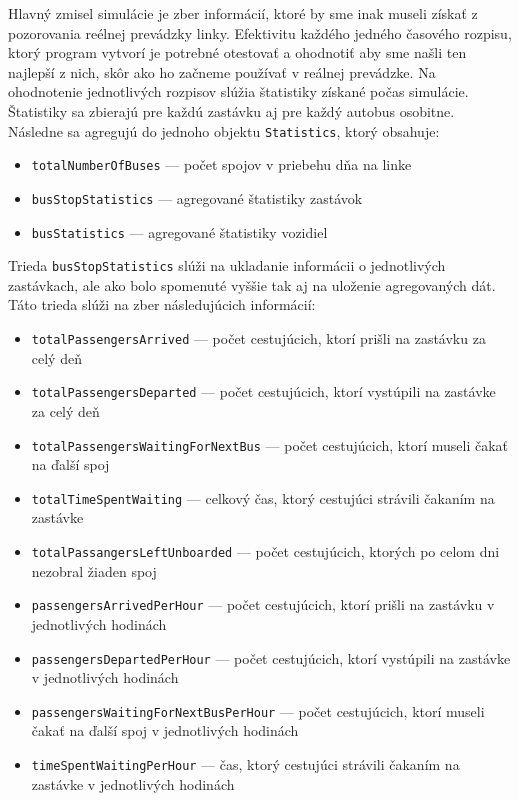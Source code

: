 Hlavný zmisel simulácie je zber informácií, ktoré by sme inak museli získať z pozorovania reélnej prevádzky linky.
Efektivitu každého jedného časového rozpisu, ktorý program vytvorí je potrebné otestovať a ohodnotiť aby sme našli ten najlepší z nich, skôr ako ho začneme používať v reálnej prevádzke.
Na ohodnotenie jednotlivých rozpisov slúžia štatistiky získané počas simulácie.
Štatistiky sa zbierajú pre každú zastávku aj pre každý autobus osobitne.
Následne sa agregujú do jednoho objektu \texttt{Statistics}, ktorý obsahuje:
\begin{itemize}
  \item \texttt{totalNumberOfBuses} --- počet spojov v priebehu dňa na linke
  \item \texttt{busStopStatistics} --- agregované štatistiky zastávok
  \item \texttt{busStatistics} --- agregované štatistiky vozidiel
\end{itemize}

Trieda \texttt{busStopStatistics} slúži na ukladanie informácii o jednotlivých zastávkach, ale ako bolo spomenuté vyššie tak aj na uloženie agregovaných dát.
Táto trieda slúži na zber následujúcich informácií:
\begin{itemize}
  \item \texttt{totalPassengersArrived} --- počet cestujúcich, ktorí prišli na zastávku za celý deň
  \item \texttt{totalPassengersDeparted} --- počet cestujúcich, ktorí vystúpili na zastávke za celý deň
  \item \texttt{totalPassengersWaitingForNextBus} --- počet cestujúcich, ktorí museli čakať na ďalší spoj
  \item \texttt{totalTimeSpentWaiting} --- celkový čas, ktorý cestujúci strávili čakaním na zastávke
  \item \texttt{totalPassangersLeftUnboarded} --- počet cestujúcich, ktorých po celom dni nezobral žiaden spoj
  \item \texttt{passengersArrivedPerHour} --- počet cestujúcich, ktorí prišli na zastávku v jednotlivých hodinách
  \item \texttt{passengersDepartedPerHour} --- počet cestujúcich, ktorí vystúpili na zastávke v jednotlivých hodinách
  \item \texttt{passengersWaitingForNextBusPerHour} --- počet cestujúcich, ktorí museli čakať na ďalší spoj v jednotlivých hodinách
  \item \texttt{timeSpentWaitingPerHour} --- čas, ktorý cestujúci strávili čakaním na zastávke v jednotlivých hodinách
\end{itemize}

